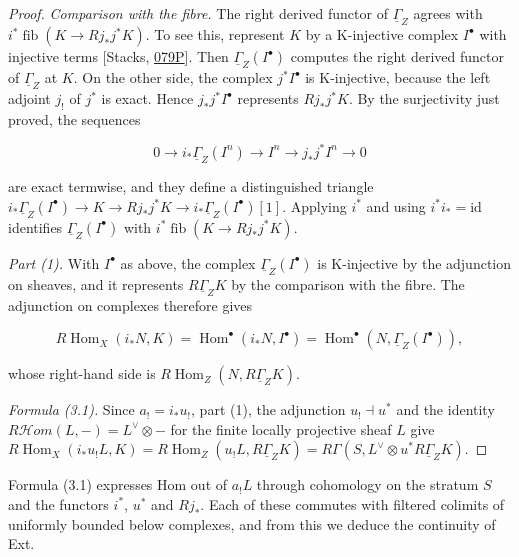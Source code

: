 \documentclass[11pt]{article}
\providecommand{\Hom}{}\renewcommand{\Hom}{\operatorname{Hom}}
\providecommand{\cHom}{}\renewcommand{\cHom}{R\mathcal{H}\!om}
\providecommand{\fib}{}\renewcommand{\fib}{\operatorname{fib}}
\begin{document}
\begin{proof}[{Proof}]
\emph{Comparison with the fibre.} The right derived functor of \(\underline\Gamma_Z\) agrees with \(i^*\fib(K\to Rj_*j^*K)\). To see this, represent \(K\) by a K-injective complex \(I^\bullet\) with injective terms [Stacks, \href{https://stacks.math.columbia.edu/tag/079P}{079P}]. Then \(\underline\Gamma_Z(I^\bullet)\) computes the right derived functor of \(\underline\Gamma_Z\) at \(K\). On the other side, the complex \(j^*I^\bullet\) is K-injective, because the left adjoint \(j_!\) of \(j^*\) is exact. Hence \(j_*j^*I^\bullet\) represents \(Rj_*j^*K\). By the surjectivity just proved, the sequences

\[
0\to i_*\underline\Gamma_Z(I^n)\to I^n\to j_*j^*I^n\to0
\]

are exact termwise, and they define a distinguished triangle \(i_*\underline\Gamma_Z(I^\bullet)\to K\to Rj_*j^*K\to i_*\underline\Gamma_Z(I^\bullet)[1]\). Applying \(i^*\) and using \(i^*i_*=\mathrm{id}\) identifies \(\underline\Gamma_Z(I^\bullet)\) with \(i^*\fib(K\to Rj_*j^*K)\).

\emph{Part (1).} With \(I^\bullet\) as above, the complex \(\underline\Gamma_Z(I^\bullet)\) is K-injective by the adjunction on sheaves, and it represents \(R\underline\Gamma_ZK\) by the comparison with the fibre. The adjunction on complexes therefore gives

\[
R\!\operatorname{Hom}_X(i_*N,K)=\Hom^\bullet(i_*N,I^\bullet)
=\Hom^\bullet(N,\underline\Gamma_Z(I^\bullet)),
\]

whose right-hand side is \(R\!\operatorname{Hom}_Z(N,R\underline\Gamma_ZK)\).

\emph{Formula (3.1).} Since \(a_!=i_*u_!\), part (1), the adjunction \(u_!\dashv u^*\) and the identity \(\cHom(L,-)=L^\vee\otimes-\) for the finite locally projective sheaf \(L\) give \(R\!\operatorname{Hom}_X(i_*u_!L,K)=R\!\operatorname{Hom}_Z(u_!L,R\underline\Gamma_ZK)
=R\Gamma(S,L^\vee\otimes u^*R\underline\Gamma_ZK)\).
\end{proof}

\label{bp259}%
Formula (3.1) expresses Hom out of \(a_!L\) through cohomology on the stratum \(S\) and the functors \(i^*\), \(u^*\) and \(Rj_*\). Each of these commutes with filtered colimits of uniformly bounded below complexes, and from this we deduce the continuity of Ext.
\end{document}
